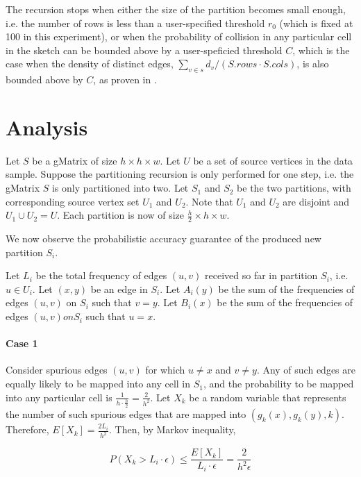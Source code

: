 The recursion stops when either the size of the partition becomes small enough, i.e. the number of rows is less than a user-specified threshold $r_0$ (which is fixed at 100 in this experiment), or when the probability of collision in any particular cell in the sketch can be bounded above by a user-speficied threshold $C$, which is the case when the density of distinct edges, $\sum_{v \in s} d_v/(S.rows \cdot S.cols)$, is also bounded above by $C$, as proven in \cite{DBLP}.

\section{Analysis}

Let $S$ be a gMatrix of size $h\times h\times w$. Let $U$ be a set of source vertices in the data sample. Suppose the partitioning recursion is only performed for one step, i.e. the gMatrix $S$ is only partitioned into two. Let $S_1$ and $S_2$ be the two partitions, with corresponding source vertex set $U_1$ and $U_2$. Note that $U_1$ and $U_2$ are disjoint and $U_1 \cup U_2 = U$. Each partition is now of size $\frac{h}{2}\times h\times w$.

We now observe the probabilistic accuracy guarantee of the produced new partition $S_i$.

Let $L_i$ be the total frequency of edges $(u,v)$ received so far in partition $S_i$, i.e. $u \in U_i$. Let $(x,y)$ be an edge in $S_i$. Let $A_i(y)$ be the sum of the frequencies of edges $(u,v)$ on $S_i$ such that $v=y$. Let $B_i(x)$ be the sum of the frequencies of edges $(u,v) on S_i$ such that $u=x$.

\paragraph{Case 1} Consider spurious edges $(u,v)$ for which $u \neq x$ and $v \neq y$. Any of such edges are equally likely to be mapped into any cell in $S_1$, and the probability to be mapped into any particular cell is $\frac{1}{h \cdot \frac{h}{2}} = \frac{2}{h^2}$. Let $X_k$ be a random variable that represents the number of such spurious edges that are mapped into $(g_k(x),g_k(y),k)$. Therefore, $E[X_k] = \frac{2L_i}{h^2}$. Then, by Markov inequality,

\begin{equation} \label{efreq1}
P(X_k > L_i \cdot \epsilon) \leq \frac{E[X_k]}{L_i \cdot \epsilon} = \frac{2}{h^2\epsilon}
\end{equation}

